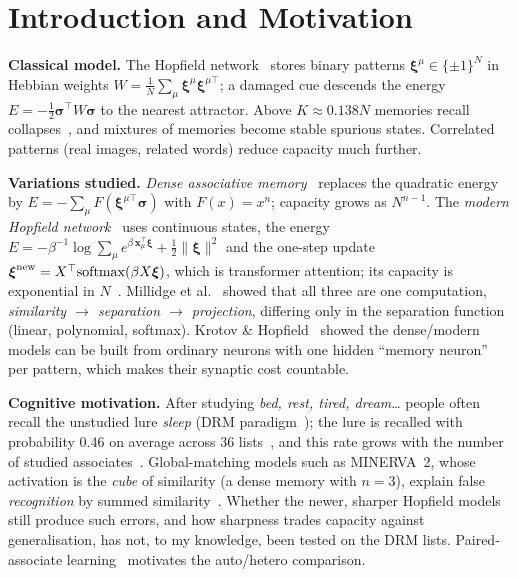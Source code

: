 \documentclass[conference]{IEEEtran}
\begin{document}
\section{Introduction and Motivation}
\textbf{Classical model.} The Hopfield network~\cite{hopfield82} stores binary patterns $\boldsymbol\xi^\mu\in\{\pm1\}^N$ in Hebbian weights $W=\frac1N\sum_\mu\boldsymbol\xi^\mu\boldsymbol\xi^{\mu\top}$; a damaged cue descends the energy $E=-\frac12\boldsymbol\sigma^\top W\boldsymbol\sigma$ to the nearest attractor. Above $K\approx0.138N$ memories recall collapses~\cite{ags85}, and mixtures of memories become stable spurious states. Correlated patterns (real images, related words) reduce capacity much further.

\textbf{Variations studied.} \emph{Dense associative memory}~\cite{krotov16} replaces the quadratic energy by $E=-\sum_\mu F(\boldsymbol\xi^{\mu\top}\boldsymbol\sigma)$ with $F(x)=x^n$; capacity grows as $N^{n-1}$. The \emph{modern Hopfield network}~\cite{ramsauer21} uses continuous states, the energy $E=-\beta^{-1}\log\sum_\mu e^{\beta\,\mathbf{x}_\mu^\top\boldsymbol\xi}+\frac12\|\boldsymbol\xi\|^2$ and the one-step update $\boldsymbol\xi^{\rm new}=X^\top\mathrm{softmax}(\beta X\boldsymbol\xi)$, which is transformer attention; its capacity is exponential in $N$~\cite{demircigil17,ramsauer21}. Millidge et al.~\cite{millidge22} showed that all three are one computation, \emph{similarity $\rightarrow$ separation $\rightarrow$ projection}, differing only in the separation function (linear, polynomial, softmax). Krotov \& Hopfield~\cite{krotov21} showed the dense/modern models can be built from ordinary neurons with one hidden ``memory neuron'' per pattern, which makes their synaptic cost countable.

\textbf{Cognitive motivation.} After studying \emph{bed, rest, tired, dream}\ldots{} people often recall the unstudied lure \emph{sleep} (DRM paradigm~\cite{roediger95}); the lure is recalled with probability 0.46 on average across 36 lists~\cite{stadler99}, and this rate grows with the number of studied associates~\cite{robinson97}. Global-matching models such as MINERVA~2, whose activation is the \emph{cube} of similarity (a dense memory with $n=3$), explain false \emph{recognition} by summed similarity~\cite{arndt98}. Whether the newer, sharper Hopfield models still produce such errors, and how sharpness trades capacity against generalisation, has not, to my knowledge, been tested on the DRM lists. Paired-associate learning~\cite{nelson04} motivates the auto/hetero comparison.
\end{document}
